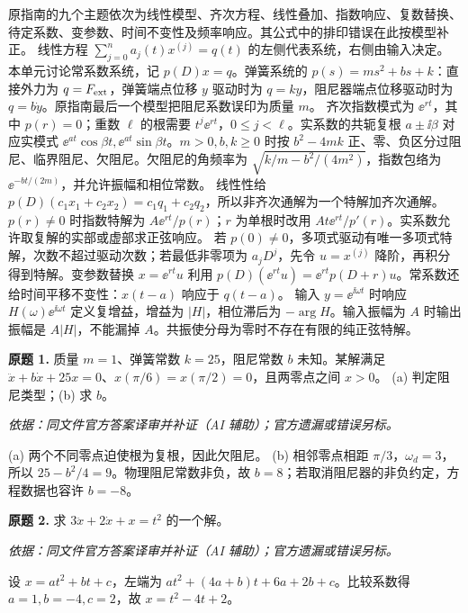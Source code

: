 原指南的九个主题依次为线性模型、齐次方程、线性叠加、指数响应、复数替换、待定系数、变参数、时间不变性及频率响应。其公式中的排印错误在此按模型补正。
线性方程 $\sum_{j=0}^n a_j(t)x^{(j)}=q(t)$ 的左侧代表系统，右侧由输入决定。本单元讨论常系数系统，记 $p(D)x=q$。弹簧系统的 $p(s)=ms^2+bs+k$：直接外力为 $q=F_{\rm ext}$，弹簧端点位移 $y$ 驱动时为 $q=ky$，阻尼器端点位移驱动时为 $q=b\dot y$。原指南最后一个模型把阻尼系数误印为质量 $m$。
齐次指数模式为 $\ee^{rt}$，其中 $p(r)=0$；重数 $\ell$ 的根需要 $t^j\ee^{rt}$，$0\le j<\ell$。实系数的共轭复根 $a\pm\ii\beta$ 对应实模式 $\ee^{at}\cos\beta t,\ee^{at}\sin\beta t$。$m>0,b,k\ge0$ 时按 $b^2-4mk$ 正、零、负区分过阻尼、临界阻尼、欠阻尼。欠阻尼的角频率为 $\sqrt{k/m-b^2/(4m^2)}$，指数包络为 $\ee^{-bt/(2m)}$，并允许振幅和相位常数。
线性性给 $p(D)(c_1x_1+c_2x_2)=c_1q_1+c_2q_2$，所以非齐次通解为一个特解加齐次通解。$p(r)\ne0$ 时指数特解为 $A\ee^{rt}/p(r)$；$r$ 为单根时改用 $At\ee^{rt}/p'(r)$。实系数允许取复解的实部或虚部求正弦响应。
若 $p(0)\ne0$，多项式驱动有唯一多项式特解，次数不超过驱动次数；若最低非零项为 $a_jD^j$，先令 $u=x^{(j)}$ 降阶，再积分得到特解。变参数替换 $x=\ee^{rt}u$ 利用 $p(D)(\ee^{rt}u)=\ee^{rt}p(D+r)u$。常系数还给时间平移不变性：$x(t-a)$ 响应于 $q(t-a)$。
输入 $y=\ee^{\ii\omega t}$ 时响应 $H(\omega)\ee^{\ii\omega t}$ 定义复增益，增益为 $|H|$，相位滞后为 $-\arg H$。输入振幅为 $A$ 时输出振幅是 $A|H|$，不能漏掉 $A$。共振使分母为零时不存在有限的纯正弦特解。
\begin{exercise}\label{cw:prex2-1}\textbf{原题 1.} 质量 $m=1$、弹簧常数 $k=25$，阻尼常数 $b$ 未知。某解满足 $\ddot x+b\dot x+25x=0$、$x(\pi/6)=x(\pi/2)=0$，且两零点之间 $x>0$。
(a) 判定阻尼类型；(b) 求 $b$。
\end{exercise}
\begin{solution}
\textit{依据：同文件官方答案译审并补证（AI 辅助）；官方遗漏或错误另标。}\par
(a) 两个不同零点迫使根为复根，因此欠阻尼。
(b) 相邻零点相距 $\pi/3$，$\omega_d=3$，所以 $25-b^2/4=9$。物理阻尼常数非负，故 $b=8$；若取消阻尼器的非负约定，方程数据也容许 $b=-8$。
\end{solution}
\begin{exercise}\label{cw:prex2-2}\textbf{原题 2.} 求 $3\ddot x+2\dot x+x=t^2$ 的一个解。
\end{exercise}
\begin{solution}
\textit{依据：同文件官方答案译审并补证（AI 辅助）；官方遗漏或错误另标。}\par
设 $x=at^2+bt+c$，左端为 $at^2+(4a+b)t+6a+2b+c$。比较系数得 $a=1,b=-4,c=2$，故 $x=t^2-4t+2$。
\end{solution}
